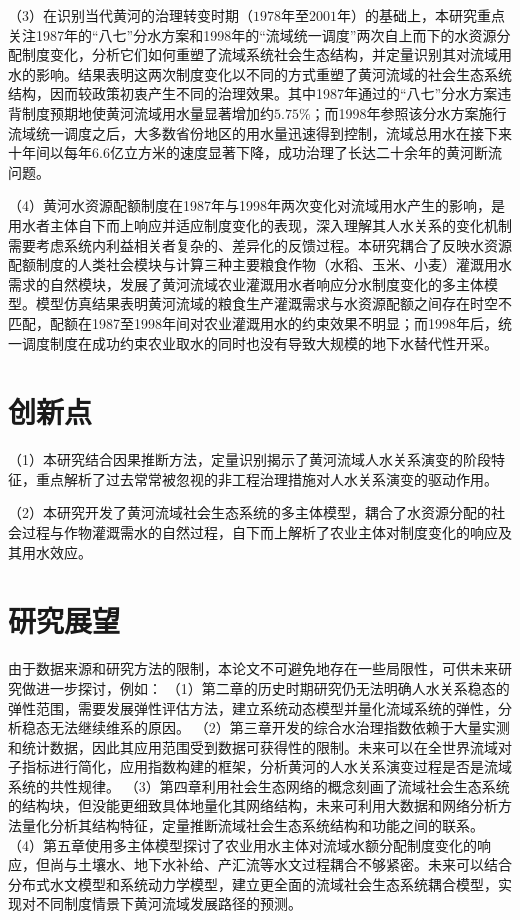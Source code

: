 （3）在识别当代黄河的治理转变时期（$1978$年至$2001$年）的基础上，本研究重点关注1987年的``八七''分水方案和1998年的“流域统一调度”两次自上而下的水资源分配制度变化，分析它们如何重塑了流域系统社会\textendash{}生态结构，并定量识别其对流域用水的影响。结果表明这两次制度变化以不同的方式重塑了黄河流域的社会\textendash{}生态系统结构，因而较政策初衷产生不同的治理效果。其中1987年通过的``八七''分水方案违背制度预期地使黄河流域用水量显著增加约$5.75\%$；而1998年参照该分水方案施行流域统一调度之后，大多数省份地区的用水量迅速得到控制，流域总用水在接下来十年间以每年$6.6$亿立方米的速度显著下降，成功治理了长达二十余年的黄河断流问题。

（4）黄河水资源配额制度在1987年与1998年两次变化对流域用水产生的影响，是用水者主体自下而上响应并适应制度变化的表现，深入理解其人\textendash{}水关系的变化机制需要考虑系统内利益相关者复杂的、差异化的反馈过程。本研究耦合了反映水资源配额制度的人类社会模块与计算三种主要粮食作物（水稻、玉米、小麦）灌溉用水需求的自然模块，发展了黄河流域农业灌溉用水者响应分水制度变化的多主体模型。模型仿真结果表明黄河流域的粮食生产灌溉需求与水资源配额之间存在时空不匹配，配额在1987至1998年间对农业灌溉用水的约束效果不明显；而1998年后，统一调度制度在成功约束农业取水的同时也没有导致大规模的地下水替代性开采。

\section{创新点}

（1）本研究结合因果推断方法，定量识别揭示了黄河流域人\textendash{}水关系演变的阶段特征，重点解析了过去常常被忽视的非工程治理措施对人\textendash{}水关系演变的驱动作用。

（2）本研究开发了黄河流域社会\textendash{}生态系统的多主体模型，耦合了水资源分配的社会过程与作物灌溉需水的自然过程，自下而上解析了农业主体对制度变化的响应及其用水效应。

\section{研究展望}

由于数据来源和研究方法的限制，本论文不可避免地存在一些局限性，可供未来研究做进一步探讨，例如：
（1）第二章的历史时期研究仍无法明确人\textendash{}水关系稳态的弹性范围，需要发展弹性评估方法，建立系统动态模型并量化流域系统的弹性，分析稳态无法继续维系的原因。
（2）第三章开发的综合水治理指数依赖于大量实测和统计数据，因此其应用范围受到数据可获得性的限制。未来可以在全世界流域对子指标进行简化，应用指数构建的框架，分析黄河的人\textendash{}水关系演变过程是否是流域系统的共性规律。
（3）第四章利用社会\textendash{}生态网络的概念刻画了流域社会\textendash{}生态系统的结构块，但没能更细致具体地量化其网络结构，未来可利用大数据和网络分析方法量化分析其结构特征，定量推断流域社会\textendash{}生态系统结构和功能之间的联系。
（4）第五章使用多主体模型探讨了农业用水主体对流域水额分配制度变化的响应，但尚与土壤水、地下水补给、产汇流等水文过程耦合不够紧密。未来可以结合分布式水文模型和系统动力学模型，建立更全面的流域社会\textendash{}生态系统耦合模型，实现对不同制度情景下黄河流域发展路径的预测。

